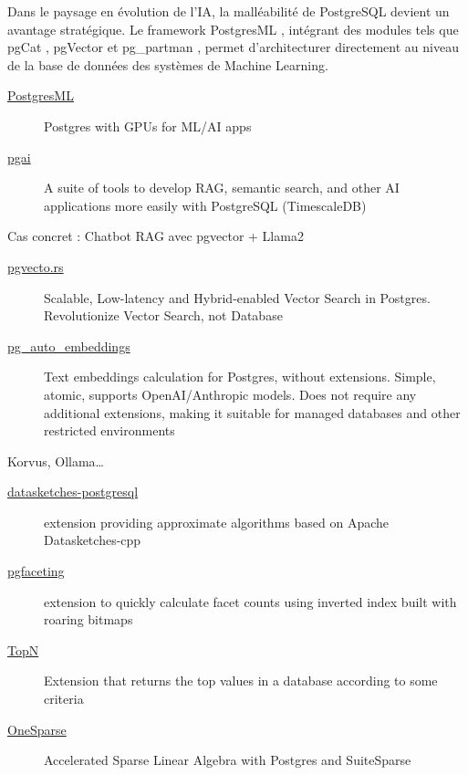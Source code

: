 \documentclass[a4paper,12pt]{article}
\begin{document}
\begin{multicols*}{2}
Dans le paysage en évolution de l'IA, la malléabilité de PostgreSQL devient un avantage stratégique. Le framework PostgresML , intégrant des modules tels que pgCat , pgVector  et pg\_partman , permet d’architecturer directement au niveau de la base de données des systèmes de Machine Learning. 

\begin{description}
\item[{\href{https://github.com/postgresml/postgresml}{PostgresML}}] Postgres with GPUs for ML/AI apps
\item[{\href{https://github.com/timescale/pgai}{pgai}}] A suite of tools to develop RAG, semantic search, and other AI applications more easily with PostgreSQL (TimescaleDB)
\end{description}
Cas concret : Chatbot RAG avec pgvector + Llama2
\begin{description}
\item[{\href{https://github.com/tensorchord/pgvecto.rs}{pgvecto.rs}}] Scalable, Low-latency and Hybrid-enabled Vector Search in Postgres. Revolutionize Vector Search, not Database
\item[{\href{https://github.com/ElKornacio/pg\_auto\_embeddings}{pg\_auto\_embeddings}}] Text embeddings calculation for Postgres, without extensions. Simple, atomic, supports OpenAI/Anthropic models. Does not require any additional extensions, making it suitable for managed databases and other restricted environments
\end{description}

Korvus, Ollama\ldots{}

\begin{description}
\item[{\href{https://github.com/apache/datasketches-postgresql}{datasketches-postgresql}}] extension providing approximate algorithms based on Apache Datasketches-cpp
\item[{\href{https://github.com/cybertec-postgresql/pgfaceting}{pgfaceting}}] extension to quickly calculate facet counts using inverted index built with roaring bitmaps
\item[{\href{https://github.com/citusdata/postgresql-topn}{TopN}}] Extension that returns the top values in a database according to some criteria
\item[{\href{https://github.com/OneSparse/OneSparse}{OneSparse}}] Accelerated Sparse Linear Algebra with Postgres and SuiteSparse


\end{description}
\end{multicols*}
\end{document}
